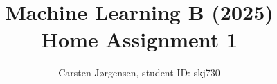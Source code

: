 \documentclass[a4paper,12pt]{article}
\begin{document}
\title{Machine Learning B (2025)\\Home Assignment 1}
\author{\color{red}Carsten Jørgensen, student ID: skj730}
\date{}
\maketitle

\tableofcontents %
\newpage %







\appendix


\printbibliography %
\nocite{*}
\end{document}

